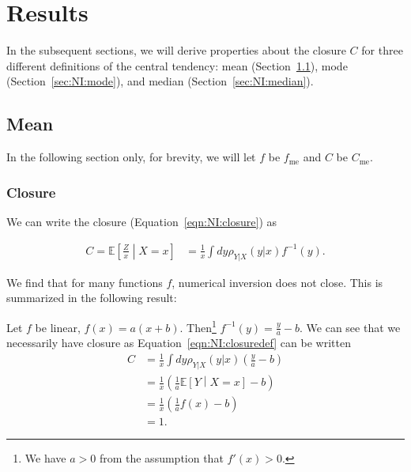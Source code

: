 \section{Results}

In the subsequent sections, we will derive properties about the closure $C$ for three different definitions of the central tendency: mean (Section~\ref{sec:NI:mean}), mode (Section~\ref{sec:NI:mode}), and median (Section~\ref{sec:NI:median}).

\subsection{Mean}
\label{sec:NI:mean}

In the following section only, for brevity, we will let $f$ be $f_\text{me}$ and $C$ be $C_\text{me}$.
\subsubsection{Closure}
\label{sec:NI:meanclosuresection}

We can write the closure (Equation~\ref{eqn:NI:closure}) as

\begin{align}
C = \mathbb{E}\left[\frac{Z}{x}\middle| X=x\right] &=\frac{1}{x} \int dy \rho_{Y|X}(y|x) f^{-1}(y).
\label{eqn:NI:closuredef}
\end{align}

We find that for many functions $f$, numerical inversion does not close. This is summarized in the following result:

\vspace{5mm}


\vspace{5mm}

Let $f$ be linear, $f(x) = a(x+b)$. Then\footnote{We have $a>0$ from the assumption that $f'(x)>0$.} $f^{-1}(y) = \frac{y}{a}-b$. We can see that we necessarily have closure as Equation~\ref{eqn:NI:closuredef} can be written
\begin{align}
C &=\frac{1}{x} \int dy \rho_{Y|X}(y|x) \left(\frac{y}{a}-b\right)\nonumber\\
&=\frac{1}{x} \left(\frac{1}{a}\mathbb{E}\left[Y\middle| X=x\right]-b\right)\nonumber\\
&=\frac{1}{x} \left(\frac{1}{a}f(x)-b\right)\nonumber\\
&=1.
\label{eqn:NI:closure_linear_proof}
\end{align}

